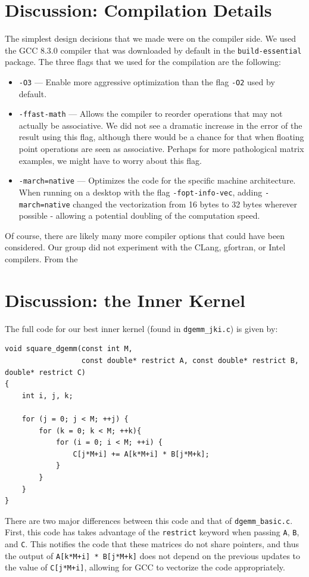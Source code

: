 \documentclass{article}
\begin{document}
\section{Discussion: Compilation Details}
The simplest design decisions that we made were on the compiler side. We used the GCC 8.3.0 compiler that was downloaded by default in the \texttt{build-essential} package. The three flags that we used for the compilation are the following:
\begin{itemize}
	\item \texttt{-O3} --- Enable more aggressive optimization than the flag \texttt{-O2} used by default. 
	\item \texttt{-ffast-math} --- Allows the compiler to reorder operations that may not actually be associative. We did not see a dramatic increase in the error of the result using this flag, although there would be a chance for that when floating point operations are seen as associative. Perhaps for more pathological matrix examples, we might have to worry about this flag.
	\item \texttt{-march=native} --- Optimizes the code for the specific machine architecture. When running on a desktop with the flag \texttt{-fopt-info-vec}, adding \texttt{-march=native} changed the vectorization from 16 bytes to 32 bytes wherever possible - allowing a potential doubling of the computation speed.
\end{itemize}

Of course, there are likely many more compiler options that could have been considered. Our group did not experiment with the CLang, gfortran, or Intel compilers. From the 


\section{Discussion: the Inner Kernel}
The full code for our best inner kernel (found in \texttt{dgemm\_jki.c}) is given by:
\begin{verbatim}
void square_dgemm(const int M, 
                  const double* restrict A, const double* restrict B, double* restrict C)
{
    int i, j, k;
   
    for (j = 0; j < M; ++j) {			
        for (k = 0; k < M; ++k){
            for (i = 0; i < M; ++i) {
                C[j*M+i] += A[k*M+i] * B[j*M+k];
            }
        }
    }
}
\end{verbatim}

There are two major differences between this code and that of \texttt{dgemm\_basic.c}. First, this code has takes advantage of the \texttt{restrict} keyword when passing \texttt{A}, \texttt{B}, and \texttt{C}. This notifies the code that these matrices do not share pointers, and thus the output of \texttt{A[k*M+i] * B[j*M+k]} does not depend on the previous updates to the value of \texttt{C[j*M+i]}, allowing for GCC to vectorize the code appropriately. 
\end{document}
